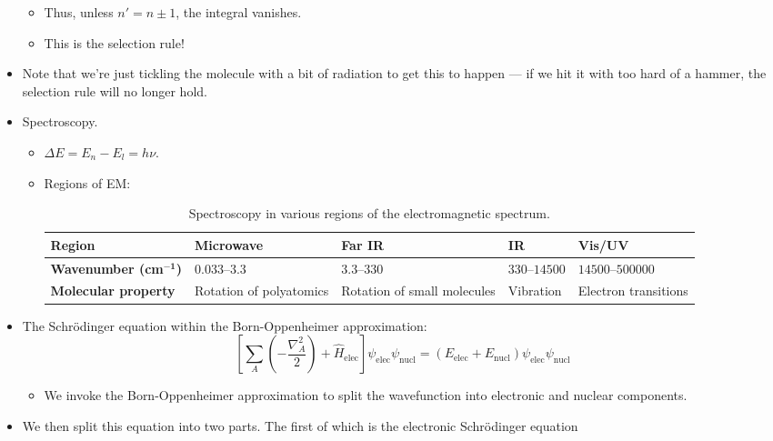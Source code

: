 \documentclass[../notes.tex]{subfiles}
\begin{document}
\begin{itemize}
\begin{itemize}
        \item Thus, unless $n'=n\pm 1$, the integral vanishes.
        \item This is the selection rule!
    \end{itemize}
    \item Note that we're just tickling the molecule with a bit of radiation to get this to happen --- if we hit it with too hard of a hammer, the selection rule will no longer hold.
    \item Spectroscopy.
    \begin{itemize}
        \item $\Delta E=E_n-E_l=h\nu$.
        \item Regions of EM:
        \begin{table}[h!]
            \centering
            \small
            \renewcommand{\arraystretch}{1.2}
            \begin{tabular}{l|llll}
                \textbf{Region} & Microwave & Far IR & IR & Vis/UV\\
                \hline
                \textbf{Wavenumber (cm${}^{\bm{-1}}$)} & $\numrange{0.033}{3.3}$ & $\numrange{3.3}{330}$ & $\numrange{330}{14500}$ & $\numrange{14500}{500000}$\\
                \hline
                \textbf{Molecular property} & Rotation of polyatomics & Rotation of small molecules & Vibration & Electron transitions\\
            \end{tabular}
            \caption{Spectroscopy in various regions of the electromagnetic spectrum.}
            \label{fig:spectroscopy}
        \end{table}
    \end{itemize}
    \item The Schr\"{o}dinger equation within the Born-Oppenheimer approximation:
    \begin{equation*}
        \left[ \sum_A\left( -\frac{\nabla_A^2}{2} \right)+\hat{H}_\text{elec} \right]\psi_\text{elec}\psi_\text{nucl} = (E_\text{elec}+E_\text{nucl})\psi_\text{elec}\psi_\text{nucl}
    \end{equation*}
    \begin{itemize}
        \item We invoke the Born-Oppenheimer approximation to split the wavefunction into electronic and nuclear components.
    \end{itemize}
    \item We then split this equation into two parts. The first of which is the electronic Schr\"{o}dinger equation

\end{itemize}
\end{document}
